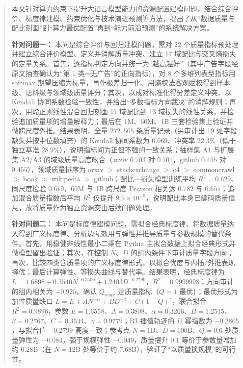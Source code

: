 
\begingroup
\renewcommand*{\mriteabstracttitlefont}{\mriteli}
\renewcommand*{\mritekeywordslabelfont}{\mriteli}

\begin{abstract}

本文针对算力约束下提升大语言模型能力的资源配置建模问题，结合综合评价、标度律建模、约束优化与技术演进预测等方法，提出了从“数据质量与配比刻画”到“算力最优配置”再到“能力前沿预测”的系统解决方案。

\textbf{针对问题一：} 本问是综合评价与回归建模问题，需对 22 个质量指标预处理并建立综合评价模型、定义并消解质量冲突、建立 17 域配比与交叉熵损失的定量关系。首先，逐指标判定方向并统一为“越高越好”（其中广告字段经原文抽查确认为“第 1 类=无广告”的正向指标），对 8 个多维列表型指标用 softmax 期望压缩为标量，再作极差归一化、用熵权法客观赋权得到样本级、语料级与领域级质量评分；其次，以成对标准化得分差定义冲突、以 Kendall 协同系数检验一致性，并给出“多数指标方向裁决”的消解规则；再次，用岭正则线性混合回归刻画 17 域配比到 13 域损失的线性关系，并检验追加质量项的增量解释力；最后在 1M、60M、1B 三套检验集上验证并做跨尺度外推。结果表明，全量 $272{,}505$ 条质量记录（另审计出 19 处字段缺失并按中位数填充）的 Kendall 协同系数为 $0.069$、冲突率 $22.3\%$（低于独立基准 $28.9\%$），说明指标间为正但不强的一致关系；抽样集 A1 与扩展集 A2/A3 的域级质量高度吻合（arxiv $0.703$ 对 $0.701$，github $0.455$ 对 $0.455$），领域质量排序为 arxiv $>$ stackexchange $>$ c4 $>$ commoncrawl $>$ book $\approx$ wikipedia $>$ github；配比—损失模型训练平均 $R^2=0.629$、同尺度检验 $0.619$，60M 与 1B 跨尺度 Pearson 相关达 $0.782$ 与 $0.651$；追加混合质量指数后平均 $R^2$ 仅提升 $9.9\times10^{-5}$，说明配比本身已编码质量信息，故将质量作为独立资源交由后续问题处理。

\textbf{针对问题二：} 本问是标度律建模问题，需拟合经典标度律、将数据质量纳入得到广义标度律、分析边际效用与弹性并推导质量与参数规模的替代条件。首先，用稳健非线性最小二乘在 Pythia 主拟合数据上拟合经典形式并做模型留出验证；其次，在控制 $N$、$D$ 的组内条件下审计质量字段方向；再次，比较四类含质量项的广义标度律形式，以拟合优度与内插/外推表现择优；最后计算弹性、等损失曲线与替代率。结果表明，经典标度律为 $L=1.6898+0.3540N^{-0.3400}+1.2403D^{-0.2799}$，$R^2=0.9999998$；方向审计的组内相关为 $-0.925$，确认 $Q_{\text{score}}$ 是质量指标（$Q=1$ 最优）；最优形式为加性质量缺口 $L=E+AN^{-\alpha}+BD^{-\beta}+C(1-Q)^{\gamma}$，联合拟合 $R^2=0.9896$，参数 $E=1.6558$、$A=0.3808$、$\alpha=0.3266$、$B=1.2515$、$\beta=0.2767$、$C=0.3544$、$\gamma=0.9779$；B3 插值轨迹的 $D$ 幂指数为 $-0.2805$，与拟合值 $-0.2799$ 高度一致；参考点 $N=1$B、$D=100$B、$Q=0.6$ 处质量弹性为 $-0.084$，强于规模弹性 $-0.049$，质量提升 $0.1$ 等价于参数量增加约 $0.28$B（在 $N=12$B 处等价于约 $7.68$B），验证了“以质量换规模”的可行性。


\end{abstract}
